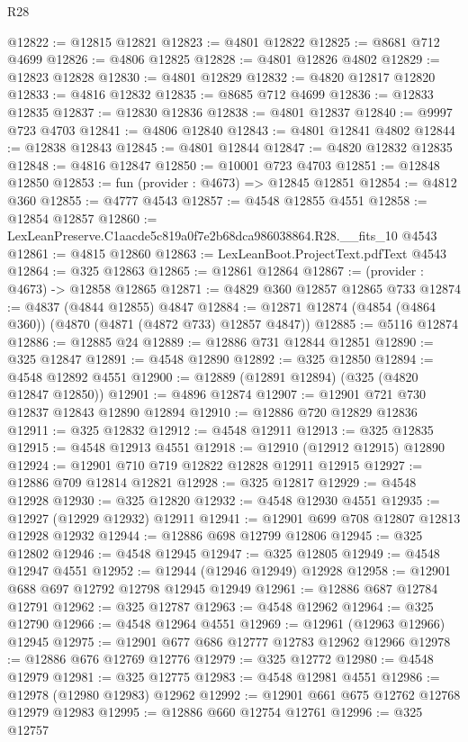 \begin{lexlean}{R28}
\begin{coremodule}
@12822 := @12815 @12821
@12823 := @4801 @12822
@12825 := @8681 @712 @4699
@12826 := @4806 @12825
@12828 := @4801 @12826 @4802
@12829 := @12823 @12828
@12830 := @4801 @12829
@12832 := @4820 @12817 @12820
@12833 := @4816 @12832
@12835 := @8685 @712 @4699
@12836 := @12833 @12835
@12837 := @12830 @12836
@12838 := @4801 @12837
@12840 := @9997 @723 @4703
@12841 := @4806 @12840
@12843 := @4801 @12841 @4802
@12844 := @12838 @12843
@12845 := @4801 @12844
@12847 := @4820 @12832 @12835
@12848 := @4816 @12847
@12850 := @10001 @723 @4703
@12851 := @12848 @12850
@12853 := fun (provider : @4673) => @12845 @12851
@12854 := @4812 @360
@12855 := @4777 @4543
@12857 := @4548 @12855 @4551
@12858 := @12854 @12857
@12860 := LexLeanPreserve.C1aacde5c819a0f7e2b68dca986038864.R28.__fits_10 @4543
@12861 := @4815 @12860
@12863 := LexLeanBoot.ProjectText.pdfText @4543
@12864 := @325 @12863
@12865 := @12861 @12864
@12867 := (provider : @4673) -> @12858 @12865
@12871 := @4829 @360 @12857 @12865 @733
@12874 := @4837 (@4844 @12855) @4847
@12884 := @12871 @12874 (@4854 (@4864 @360)) (@4870 (@4871 (@4872 @733) @12857 @4847))
@12885 := @5116 @12874
@12886 := @12885 @24
@12889 := @12886 @731 @12844 @12851
@12890 := @325 @12847
@12891 := @4548 @12890
@12892 := @325 @12850
@12894 := @4548 @12892 @4551
@12900 := @12889 (@12891 @12894) (@325 (@4820 @12847 @12850))
@12901 := @4896 @12874
@12907 := @12901 @721 @730 @12837 @12843 @12890 @12894
@12910 := @12886 @720 @12829 @12836
@12911 := @325 @12832
@12912 := @4548 @12911
@12913 := @325 @12835
@12915 := @4548 @12913 @4551
@12918 := @12910 (@12912 @12915) @12890
@12924 := @12901 @710 @719 @12822 @12828 @12911 @12915
@12927 := @12886 @709 @12814 @12821
@12928 := @325 @12817
@12929 := @4548 @12928
@12930 := @325 @12820
@12932 := @4548 @12930 @4551
@12935 := @12927 (@12929 @12932) @12911
@12941 := @12901 @699 @708 @12807 @12813 @12928 @12932
@12944 := @12886 @698 @12799 @12806
@12945 := @325 @12802
@12946 := @4548 @12945
@12947 := @325 @12805
@12949 := @4548 @12947 @4551
@12952 := @12944 (@12946 @12949) @12928
@12958 := @12901 @688 @697 @12792 @12798 @12945 @12949
@12961 := @12886 @687 @12784 @12791
@12962 := @325 @12787
@12963 := @4548 @12962
@12964 := @325 @12790
@12966 := @4548 @12964 @4551
@12969 := @12961 (@12963 @12966) @12945
@12975 := @12901 @677 @686 @12777 @12783 @12962 @12966
@12978 := @12886 @676 @12769 @12776
@12979 := @325 @12772
@12980 := @4548 @12979
@12981 := @325 @12775
@12983 := @4548 @12981 @4551
@12986 := @12978 (@12980 @12983) @12962
@12992 := @12901 @661 @675 @12762 @12768 @12979 @12983
@12995 := @12886 @660 @12754 @12761
@12996 := @325 @12757

\end{coremodule}
\end{lexlean}

